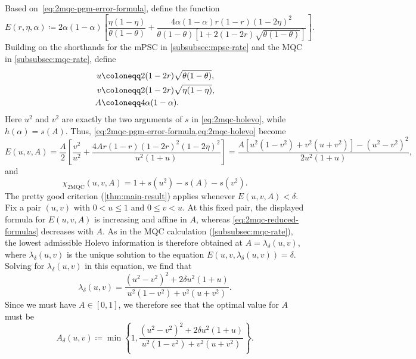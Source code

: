 \documentclass[11pt]{article}
\renewcommand{\leq}{\leqslant}
\theoremstyle{remark}
\newcommand{\mMQC}{2\mathrm{MQC}}
\begin{document}
Based on~\cref{eq:2mqc-pgm-error-formula}, define the function
\begin{equation}
\label{eq:2mqc-error-function}
E(r,\eta,\alpha) \coloneqq 
2\alpha(1-\alpha)
\left[
\frac{\eta(1-\eta)}{\theta(1-\theta)}
+\frac{4\alpha(1-\alpha)r(1-r)(1-2\eta)^2}
{\theta(1-\theta)
\left[1+2(1-2r)\sqrt{\theta(1-\theta)}\right]}
\right].
\end{equation}
Building on the shorthands for the mPSC in \cref{subsubsec:mpsc-rate} and the MQC in \cref{subsubsec:mqc-rate}, define
\begin{align}
u &\coloneqq 2(1-2r)\sqrt{\theta(1-\theta)}, \notag \\
v &\coloneqq 2(1-2r)\sqrt{\eta(1-\eta)}, \notag \\
A &\coloneqq 4\alpha(1-\alpha).
\label{eq:2mqc-entropy-coordinates}
\end{align}
Here $u^2$ and $v^2$ are exactly the two arguments of $s$ in \eqref{eq:2mqc-holevo}, while $h(\alpha)=s(A)$. Thus, \cref{eq:2mqc-pgm-error-formula,eq:2mqc-holevo} become
\begin{equation*}
E(u,v,A) = \frac{A}{2}
\left[
\frac{v^2}{u^2}
+\frac{4A r(1-r)(1-2r)^2 (1-2\eta)^2}
{u^2(1+u)}
\right] 
= \frac{A\left[u^2(1-v^2)+v^2(u+v^2)\right]-(u^2-v^2)^2}{2u^2(1+u)},
\end{equation*}
and
\begin{equation}
\label{eq:2mqc-reduced-formulas}
\chi_{\mMQC}(u,v,A) = 1+s(u^2)-s(A)-s(v^2).
\end{equation}
The pretty good criterion (\cref{thm:main-result}) applies whenever $E(u,v,A)<\delta$. Fix a pair $(u,v)$ with $0<u\leq 1$ and $0\leq v<u$. At this fixed pair, the displayed formula for $E(u,v,A)$ is increasing and affine in $A$, whereas \eqref{eq:2mqc-reduced-formulas} decreases with $A$. As in the MQC calculation (\cref{subsubsec:mqc-rate}), the lowest admissible Holevo information is therefore obtained at $A = \lambda_\delta(u,v)$, where $\lambda_\delta(u,v)$ is the unique solution to the equation $E(u,v,\lambda_\delta(u,v)) = \delta$. Solving for $\lambda_\delta(u,v)$ in this equation, we find that 
\begin{equation}
\label{eq:2mqc-exact-error-coordinates}
\lambda_\delta(u,v) = 
\frac{(u^2-v^2)^2+2\delta u^2(1+u)}
{u^2(1-v^2)+v^2(u+v^2)}.
\end{equation}
Since we must have $A \in [0,1]$, we therefore see that the optimal value for $A$ must be
\begin{equation*}
A_\delta(u,v) \coloneqq \min\left\{1,\frac{(u^2-v^2)^2+2\delta u^2(1+u)}
{u^2(1-v^2)+v^2(u+v^2)}\right\}.
\end{equation*}
\end{document}
